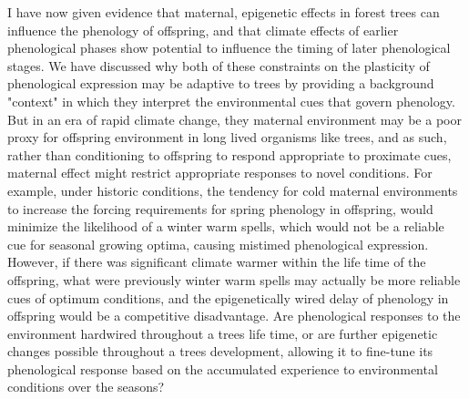\documentclass{article}\usepackage[]{graphicx}\usepackage[]{color}
\begin{document}
\par I have now given evidence that maternal, epigenetic effects in forest trees can influence the phenology of offspring, and that climate effects of earlier phenological phases show potential to influence the timing of later phenological stages. We have discussed why both of these constraints on the plasticity of phenological expression may be adaptive to trees by providing a background "context" in which they interpret the environmental cues that govern phenology. But in an era of rapid climate change, they maternal environment may be a poor proxy for offspring environment  in long lived organisms like trees, and as such, rather than conditioning to offspring to respond appropriate to proximate cues, maternal effect might restrict appropriate responses to novel conditions. For example, under historic conditions, the tendency for cold maternal environments to increase the forcing requirements for spring phenology in offspring, would minimize the likelihood of a winter warm spells, which would not be a reliable cue for seasonal growing optima, causing mistimed phenological expression. However, if there was significant climate warmer within the life time of the offspring, what were previously winter warm spells may actually be more reliable cues of optimum conditions, and the epigenetically wired delay of phenology in offspring would be a competitive disadvantage. Are phenological responses to the environment hardwired throughout a trees life time, or are further epigenetic changes possible throughout a trees development, allowing it to fine-tune its phenological response based on the accumulated experience to environmental conditions over the seasons?  
\end{document}
